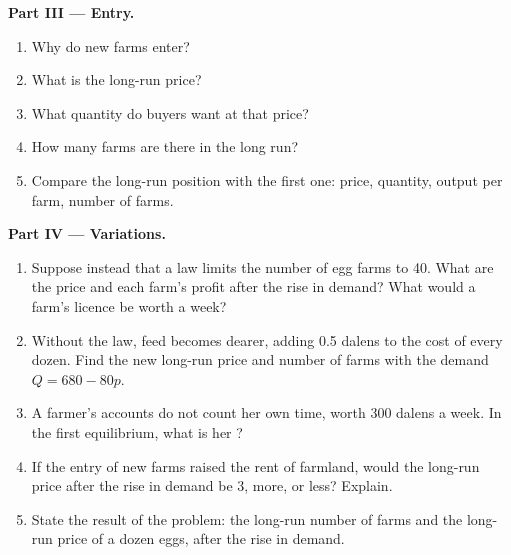 \begin{problem}
\medskip
\noindent\textbf{Part III --- Entry.}
\begin{enumerate}[resume]
\item Why do new farms enter?
\item What is the long-run price?
\item What quantity do buyers want at that price?
\item How many farms are there in the long run?
\item Compare the long-run position with the first one: price, quantity, output per farm, number of farms.
\end{enumerate}

\medskip
\noindent\textbf{Part IV --- Variations.}
\begin{enumerate}[resume]
\item Suppose instead that a law limits the number of egg farms to 40. What are the price and each farm's profit after the rise in demand? What would a farm's licence
be worth a week?
\item Without the law, feed becomes dearer, adding 0.5 dalens to the cost of every dozen. Find the new long-run price and number of farms with the demand $Q = 680
- 80p$.
\item A farmer's accounts do not count her own time, worth 300 dalens a week. In the first equilibrium, what is her ?
\item If the entry of new farms raised the rent of farmland, would the long-run price after the rise in demand be 3, more, or less? Explain.
\item State the result of the problem: the long-run number of farms and the long-run price of a dozen eggs, after the rise in demand.
\end{enumerate}
\end{problem}
